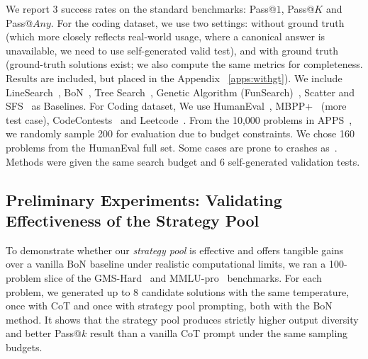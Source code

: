 \documentclass{article} %
\theoremstyle{definition}
\theoremstyle{remark}
\begin{document}
We report 3 success rates on the standard benchmarks: Pass@\!$1$, Pass@\!$K$ and Pass@\!$Any$. For the coding dataset, we use two settings: without ground truth (which more closely reflects real-world usage, where a canonical answer is unavailable, we need to use self-generated valid test), and with ground truth (ground-truth solutions exist; we also compute the same metrics for completeness. Results are included, but placed in the Appendix ~\ref{apps:withgt}). We include LineSearch~\citep{shinn2023reflexion}, BoN~\citep{brown2024largelanguagemonkeysscaling}, Tree Search~\citep{yao2023tree}, Genetic Algorithm (FunSearch)~\citep{FunSearch2023}, Scatter and SFS~\citep{light2025sfs} as Baselines. For Coding dataset, We use HumanEval~\citep{chen2021evaluating}, MBPP+~\citep{austin2021program} (more test case), CodeContests~\citep{doi:10.1126/science.abq1158} and Leetcode~\citep{guo2024deepseek}. From the 10,000 problems in APPS~\citep{hendrycks2021measuring}, we randomly sample 200 for evaluation due to budget constraints. We chose 160 problems from the HumanEval full set. Some cases are prone to crashes as~\citep{light2025sfs}. Methods were given the same search budget and 6 self-generated validation tests.

\subsection{Preliminary Experiments: Validating Effectiveness of the Strategy Pool}

To demonstrate whether our \textit{strategy pool} is effective and offers tangible gains over a vanilla BoN baseline under realistic computational limits, we ran a 100-problem slice of the GMS-Hard~\citep{gao2023pal} and MMLU-pro~\citep{wang2024mmlu} benchmarks. For each problem, we generated up to 8 candidate solutions with the same temperature, once with CoT and once with strategy pool prompting, both with the BoN method. It shows that the strategy pool produces strictly higher output diversity and better Pass@\!$k$  result than a vanilla CoT prompt under the same sampling budgets.
\end{document}
